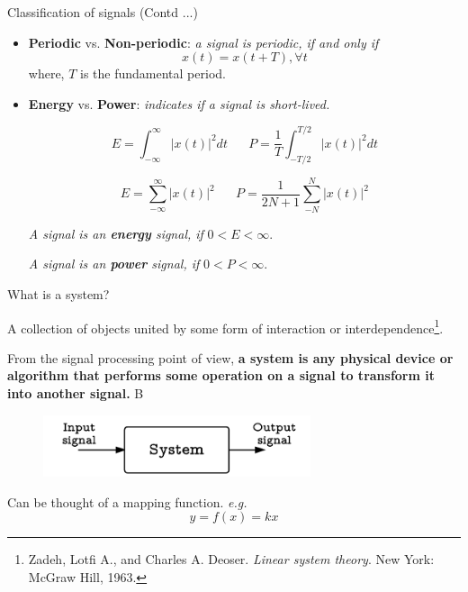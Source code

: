 \documentclass{beamer}
\begin{document}
\begin{frame}{Classification of signals (Contd ...)}
\begin{itemize}
\item \textbf{Periodic} vs. \textbf{Non-periodic}: \textit{a signal is periodic, if and only if}
\[x\left(t\right) = x\left(t + T\right), \forall t\]
where, $T$ is the fundamental period.
\item \textbf{Energy} vs. \textbf{Power}: \textit{indicates if a signal is short-lived.}

\[ E = \int_{-\infty}^{\infty}\left|x(t)\right|^2dt \,\,\,\,\,\,\,\,\,\, P=\frac{1}{T}\int_{-T/2}^{T/2}\left|x(t)\right|^2dt \]

\[ E = \sum_{-\infty}^{\infty}\left|x(t)\right|^2 \,\,\,\,\,\,\,\,\,\, P=\frac{1}{2N+1}\sum_{-N}^{N}\left|x(t)\right|^2 \]

\textit{A signal is an \textbf{energy} signal, if} $0 < E < \infty$.

\textit{A signal is an \textbf{power} signal, if} $0 < P < \infty$.
\end{itemize}
\end{frame}

\begin{frame}{What is a system?}

A collection of objects united by some form of interaction or interdependence\footnote{Zadeh, Lotfi A., and Charles A. Deoser. \textit{Linear system theory}. New York: McGraw Hill, 1963.}.

\vspace{4mm}

From the signal processing point of view, \textbf{a system is any physical device or algorithm that performs some operation on a signal to transform it into another signal.}
B
\begin{figure}
\includegraphics[width=0.7\textwidth]{img/system.png}
\end{figure}

Can be thought of a mapping function. \textit{e.g.}
\[ y = f\left(x\right) = kx \]

\end{frame}
\end{document}
